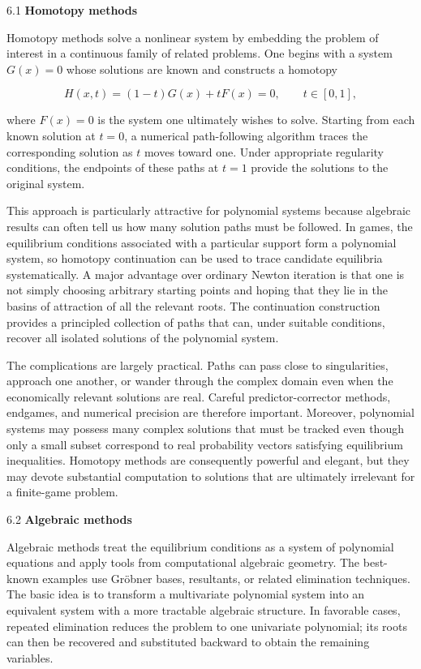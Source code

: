 \documentclass[11pt]{article}
\begin{document}
6.1 \textbf{Homotopy methods}

Homotopy methods solve a nonlinear system by embedding the problem of
interest in a continuous family of related problems. One begins with a
system \(G(x)=0\) whose solutions are known and constructs a homotopy

\[
H(x,t)=(1-t)G(x)+tF(x)=0,
\qquad t\in[0,1],
\]

where \(F(x)=0\) is the system one ultimately wishes to solve. Starting
from each known solution at \(t=0\), a numerical path-following
algorithm traces the corresponding solution as \(t\) moves toward one.
Under appropriate regularity conditions, the endpoints of these paths at
\(t=1\) provide the solutions to the original system.

This approach is particularly attractive for polynomial systems because
algebraic results can often tell us how many solution paths must be
followed. In games, the equilibrium conditions associated with a
particular support form a polynomial system, so homotopy continuation
can be used to trace candidate equilibria systematically. A major
advantage over ordinary Newton iteration is that one is not simply
choosing arbitrary starting points and hoping that they lie in the
basins of attraction of all the relevant roots. The continuation
construction provides a principled collection of paths that can, under
suitable conditions, recover all isolated solutions of the polynomial
system.

The complications are largely practical. Paths can pass close to
singularities, approach one another, or wander through the complex
domain even when the economically relevant solutions are real. Careful
predictor-corrector methods, endgames, and numerical precision are
therefore important. Moreover, polynomial systems may possess many
complex solutions that must be tracked even though only a small subset
correspond to real probability vectors satisfying equilibrium
inequalities. Homotopy methods are consequently powerful and elegant,
but they may devote substantial computation to solutions that are
ultimately irrelevant for a finite-game problem.

6.2 \textbf{Algebraic methods}

Algebraic methods treat the equilibrium conditions as a system of
polynomial equations and apply tools from computational algebraic
geometry. The best-known examples use Gröbner bases, resultants, or
related elimination techniques. The basic idea is to transform a
multivariate polynomial system into an equivalent system with a more
tractable algebraic structure. In favorable cases, repeated elimination
reduces the problem to one univariate polynomial; its roots can then be
recovered and substituted backward to obtain the remaining variables.
\end{document}
